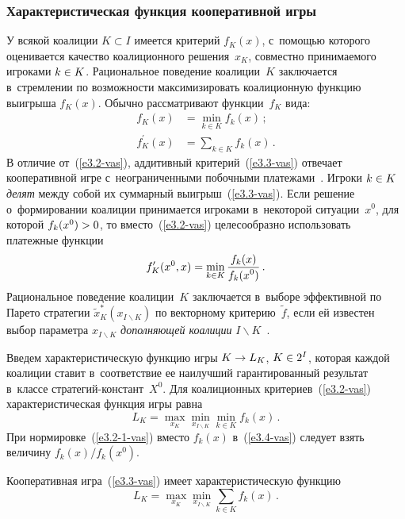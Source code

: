 \begin{multicols}{2}
    \subsubsection{Характеристическая функция кооперативной игры}

    У всякой коалиции $K\subset I$ имеется критерий $f_K(x)$, с~помощью
которого оценивается качество коалиционного решения~$x_K$, совместно
принимаемого игроками $k\hm\in K$. Рациональное поведение коалиции~$K$
заключается в~стремлении по возможности максимизировать коалиционную
функцию выигрыша $f_K(x)$. Обычно рассматривают функции~$f_K$ вида:
\begin{align}
f_K(x)&= \min\limits_{k\in K} f_k(x)\,;\label{e3.2-vas}\\
f_K^\prime(x) &= \sum\limits_{k\in K} f_k(x)\,.\label{e3.3-vas}
\end{align}
В отличие от~(\ref{e3.2-vas}), аддитивный критерий~(\ref{e3.3-vas}) отвечает
кооперативной игре с~неограниченными побочными платежами~\cite{1-vas}. Игроки
$k\hm\in K$ \textit{делят} между собой их суммарный выигрыш~(\ref{e3.3-vas}).
Если решение о~формировании коалиции принимается игроками в~некоторой
ситуации~$x^0$, для которой $f_k(x^0) \hm> 0$, то вместо~(\ref{e3.2-vas})
целесообразно использовать платежные функции
\begin{equation}
f_K^\prime(x^0,x) =\min\limits_{k\in K} \displaystyle\frac{\displaystyle f_k(x)\mathstrut}{\displaystyle f_k(x^0)\mathstrut}\,.
\label{e3.2-1-vas}
\end{equation}
Рациональное поведение коалиции~$K$ заключается в~выборе эффективной по
Парето стратегии $\tilde{x}^*_K(x_{I\backslash K})$ по векторному
критерию~$\tilde{f}$, если ей из\-вес\-тен выбор параметра $ x_{I\backslash K}$
\textit{дополняющей коалиции} $I\backslash K$~\cite{14-vas, 17-vas}.

    Введем характеристическую функцию игры $K\hm\to L_K$, $K\hm\in 2^I$,
которая каждой коалиции ставит в~соответствие ее наилучший гарантированный
результат в~классе стра\-те\-гий-констант~$X^0$. Для коалиционных
критериев~(\ref{e3.2-vas}) характеристическая функция игры равна
    \begin{equation}
    L_K=\max\limits_{x_K} \min\limits_{x_{I\backslash K}} \min\limits_{k\in K}
f_k(x)\,.
    \label{e3.4-vas}
    \end{equation}
При нормировке~(\ref{e3.2-1-vas}) вместо $f_k(x)$ в~(\ref{e3.4-vas}) следует взять
величину $f_k(x)/f_k(x^0)$.

    Кооперативная игра~(\ref{e3.3-vas}) имеет характеристическую функцию
    \begin{equation}
    L_K=\max\limits_{x_K} \min\limits_{x_{I\backslash K}} \sum\limits_{k\in K}
f_k(x)\,.
    \label{e3.5-vas}
    \end{equation}


\end{multicols}
